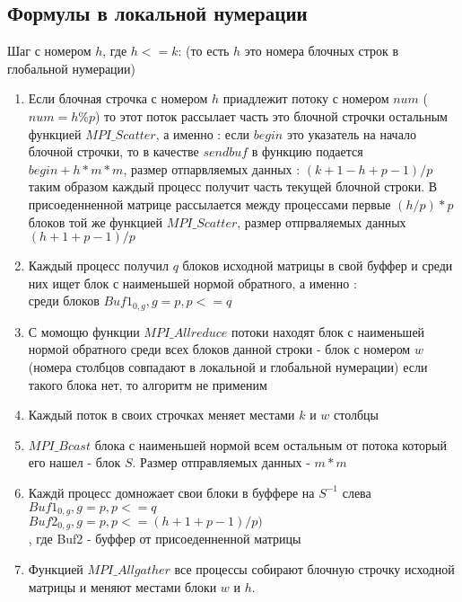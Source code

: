 \documentclass[a4paper,12pt]{article}
\begin{document}
\subsection{Формулы в локальной нумерации}
Шаг с номером $h$, где $h <= k$: (то есть $h$ это номера блочных строк в глобальной нумерации)\\
\begin{enumerate}
\item Если блочная строчка с номером $h$ приадлежит потоку с номером $num$ ($num = h\%p$)
    то этот поток рассылает часть это блочной строчки остальным функцией $MPI\_Scatter$, а именно :
    если $begin$ это указатель на начало блочной строчки, то в качестве $sendbuf$ в функцию подается
    $begin + h * m * m$, размер отпарвляемых данных : $(k + 1 - h + p - 1)/p$ таким образом каждый процесс получит часть текущей блочной строки.
    В присоеденненной матрице рассылается между процессами первые $(h/p) * p$ блоков той же функцией
    $MPI\_Scatter$, размер отпрваляемых данных  $(h + 1 + p - 1)/p$
\item Каждый процесс получил $q$ блоков исходной матрицы в свой буффер и среди них ищет блок с наименьшей нормой обратного, а именно :\\
    среди блоков $Buf1_{0, g}, g = p, p <= q$ \\
\item С момощю функции $MPI\_Allreduce$ потоки находят блок с наименьшей нормой обратного среди всех блоков
    данной строки - блок с номером $w$ (номера столбцов совпадают в локальной и глобальной нумерации)
    если такого блока нет, то алгоритм не применим\\
\item Каждый поток в своих строчках меняет местами $k$ и $w$ столбцы\\
\item $MPI\_Bcast$ блока с наименьшей нормой всем остальным от потока который его нашел - блок $S$. 
    Размер отправляемых данных - $m * m$\\
\item Каждй процесс домножает свои блоки в буффере на $S^{-1}$ слева\\
    $Buf1_{0, g}, g = p, p <= q$\\
    $Buf2_{0, g}, g = p, p <= (h + 1 + p - 1)/p)$\\
    , где Buf2 - буффер от присоеденненной матрицы\\
\item Функцией $MPI\_Allgather$ все процессы собирают блочную строчку исходной матрицы и меняют местами блоки $w$ и $h$.

\end{enumerate}
\end{document}
